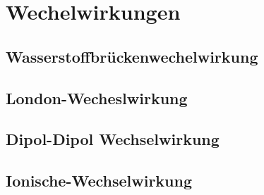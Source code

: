 \section{Wechelwirkungen}
\subsection{Wasserstoffbrückenwechelwirkung}
\subsection{London-Wecheslwirkung}
\subsection{Dipol-Dipol Wechselwirkung}
\subsection{Ionische-Wechselwirkung}

